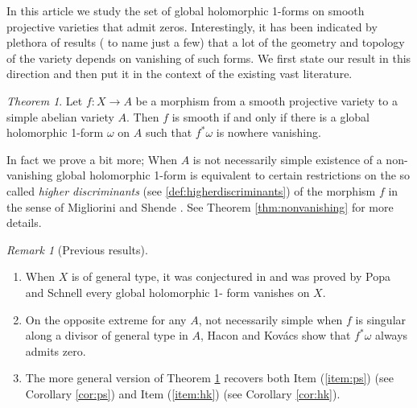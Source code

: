 \documentclass[a4paper,12pt,reqno]{amsart}
\theoremstyle{plain}
\theoremstyle{definition}
\theoremstyle{remark}
\newtheorem{remark}[theorem]{Remark}
\newtheorem{alphtheorem}{Theorem}
\begin{document}
In this article we study the set of global holomorphic 1-forms  on smooth projective varieties that admit zeros. Interestingly, it has been
indicated by plethora of results (\cite{GL87, HK05, LZ05,
SS19, HS19, PS14} to name just a few) that a lot of the geometry
and topology of the variety depends on vanishing of such forms.
We first state our result in this direction and then put it in the context of 
the existing vast literature.
\begin{alphtheorem}\label{thm:smooth}
Let $f:X\to A$ be a morphism from a smooth projective variety to a simple abelian variety $A$. Then $f$ is smooth if and only if there is a global holomorphic 1-form $\omega	$ on $A$ such that $f^*\omega$ is nowhere vanishing. 
\end{alphtheorem}
In fact we prove a bit more; When $A$ is not necessarily simple
existence of a non-vanishing global holomorphic 1-form
is equivalent to certain restrictions on the so called \emph{higher discriminants} (see \ref{def:higherdiscriminants}) of the morphism $f$ in the sense
of Migliorini and Shende \cite{MiSh18}.
See Theorem \ref{thm:nonvanishing} for more details.
\begin{remark}[Previous results]
\begin{enumerate}
\item \label{item:ps} When $X$ is of general type, it was conjectured in
	\cite{HK05, LZ05} and was proved
	by Popa and Schnell \cite{PS14} every global holomorphic 1-		
	form vanishes on $X$. 
\item \label{item:hk} On the opposite extreme for any $A$, not necessarily simple when $f$ is singular along a divisor of general
		type in $A$, Hacon and Kov\'acs \cite[Proposition 3.5.]{HK05} show that
		$f^*\omega$ always admits zero.
\item The more general version of Theorem \ref{thm:smooth}
recovers both Item (\ref{item:ps}) (see Corollary \ref{cor:ps})
and Item (\ref{item:hk}) (see Corollary \ref{cor:hk}).
\end{enumerate}
\end{remark}
\end{document}
